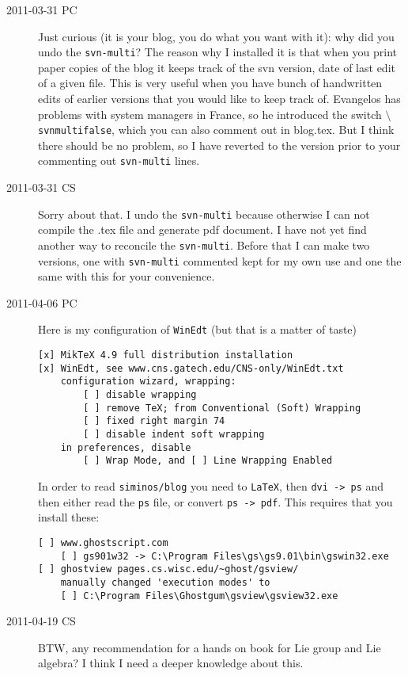 \begin{description}
\item[2011-03-31 PC] Just curious (it is your blog, you do what you want with it):
    why did you undo the \texttt{svn-multi}? The reason why I installed
    it is that when you print paper copies of the blog it keeps track of
    the svn version, date of last edit of a given file. This is very
    useful when you have bunch of handwritten edits of earlier versions
    that you would like to keep track of. Evangelos has problems with
    system managers in France, so he introduced the switch
    \texttt{$\setminus$svnmultifalse}, which you can also comment out in
    blog.tex. But I think there should be no problem, so I have reverted
    to the version prior to your commenting out \texttt{svn-multi} lines.

\item[2011-03-31 CS] Sorry about that. I undo the \texttt{svn-multi}
because otherwise I can not compile the .tex file and generate pdf
document. I have not yet find another way to reconcile the
\texttt{svn-multi}. Before that I can make two versions, one with
\texttt{svn-multi} commented kept for my own use and one the same with
this for your convenience.

\item[2011-04-06 PC] Here is my configuration of \texttt{WinEdt}
(but that is a matter of taste)

\begin{verbatim}
[x] MikTeX 4.9 full distribution installation
[x] WinEdt, see www.cns.gatech.edu/CNS-only/WinEdt.txt
	configuration wizard, wrapping:
        [ ] disable wrapping
		[ ] remove TeX; from Conventional (Soft) Wrapping
		[ ] fixed right margin 74
		[ ] disable indent soft wrapping
	in preferences, disable
		[ ] Wrap Mode, and [ ] Line Wrapping Enabled
\end{verbatim}

In order to read \texttt{siminos/blog} you need to \texttt{LaTeX},
then \texttt{dvi -> ps} and then either read the \texttt{ps} file, or
convert \texttt{ps -> pdf}. This requires that you install these:

\begin{verbatim}
[ ] www.ghostscript.com
    [ ] gs901w32 -> C:\Program Files\gs\gs9.01\bin\gswin32.exe
[ ] ghostview pages.cs.wisc.edu/~ghost/gsview/
    manually changed 'execution modes' to
    [ ] C:\Program Files\Ghostgum\gsview\gsview32.exe
\end{verbatim}

\item[2011-04-19 CS]
BTW, any recommendation for a hands on book for Lie group and Lie
algebra? I think I need a deeper knowledge about this.


\end{description}
